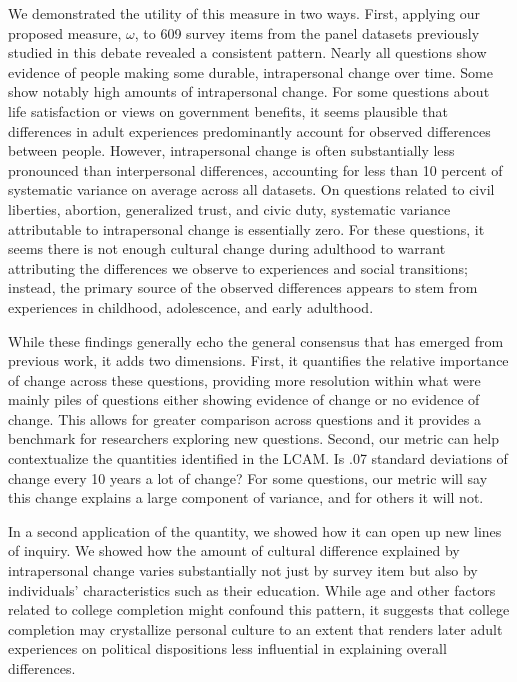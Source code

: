 \documentclass[
  11pt,
]{article}
\begin{document}
We demonstrated the utility of this measure in two ways. First, applying
our proposed measure, \(\omega\), to 609 survey items from the panel
datasets previously studied in this debate revealed a consistent
pattern. Nearly all questions show evidence of people making some
durable, intrapersonal change over time. Some show notably high amounts
of intrapersonal change. For some questions about life satisfaction or
views on government benefits, it seems plausible that differences in
adult experiences predominantly account for observed differences between
people. However, intrapersonal change is often substantially less
pronounced than interpersonal differences, accounting for less than 10
percent of systematic variance on average across all datasets. On
questions related to civil liberties, abortion, generalized trust, and
civic duty, systematic variance attributable to intrapersonal change is
essentially zero. For these questions, it seems there is not enough
cultural change during adulthood to warrant attributing the differences
we observe to experiences and social transitions; instead, the primary
source of the observed differences appears to stem from experiences in
childhood, adolescence, and early adulthood.

While these findings generally echo the general consensus that has
emerged from previous work, it adds two dimensions. First, it quantifies
the relative importance of change across these questions, providing more
resolution within what were mainly piles of questions either showing
evidence of change or no evidence of change. This allows for greater
comparison across questions and it provides a benchmark for researchers
exploring new questions. Second, our metric can help contextualize the
quantities identified in the LCAM. Is .07 standard deviations of change
every 10 years a lot of change? For some questions, our metric will say
this change explains a large component of variance, and for others it
will not.

In a second application of the quantity, we showed how it can open up
new lines of inquiry. We showed how the amount of cultural difference
explained by intrapersonal change varies substantially not just by
survey item but also by individuals' characteristics such as their
education. While age and other factors related to college completion
might confound this pattern, it suggests that college completion may
crystallize personal culture to an extent that renders later adult
experiences on political dispositions less influential in explaining
overall differences.
\end{document}
